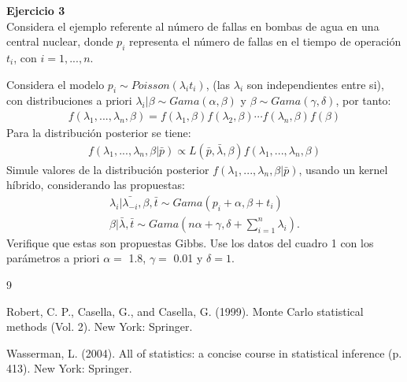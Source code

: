 \documentclass[a4paper, 11pt]{article}
\newenvironment{problem}[2][Ejercicio]
{ \begin{mdframed}[backgroundcolor= red!50] \textbf{#1 #2} \\}
	{  \end{mdframed}}
\begin{document}
\newpage


\begin{problem}{3} 
  Considera el ejemplo referente al número de fallas en bombas de agua en una central nuclear, donde $p_i$ representa el número de fallas en el tiempo de operación $t_i$, con $i = 1,...,n$.

  Considera el modelo $p_i \sim Poisson(\lambda_i t_i)$, (las $\lambda_i$ son independientes entre si), con distribuciones a priori $\lambda_i |\beta \sim Gama(\alpha,\beta)$ y $ \beta \sim Gama(\gamma,\delta)$, por tanto:
  \begin{align*}
    f(\lambda_1,...,\lambda_n,\beta) = f(\lambda_1,\beta)f(\lambda_2,\beta)\cdots f(\lambda_n,\beta)f(\beta)
  \end{align*}
  Para la distribución posterior se tiene: 
  \begin{align*}
    f(\lambda_1,...,\lambda_n,\beta|\bar{p}) \propto L(\bar{p}, \bar{\lambda},\beta)f(\lambda_1,...,\lambda_n,\beta)
  \end{align*}
  Simule valores de la distribución posterior $f(\lambda_1,...,\lambda_n,\beta|\bar{p})$, usando un kernel híbrido, considerando las propuestas:
  \begin{align*}
    \lambda_i|\bar{\lambda_{-i}},\beta,\bar{t} \sim Gama(p_i + \alpha, \beta +t_i)\\
    \beta| \bar{\lambda}, \bar{t} \sim Gama \left(n\alpha + \gamma , \delta + \sum_{i=1}^{n}\lambda_i\right) .
  \end{align*}
  Verifique que estas son propuestas Gibbs.
  Use los datos del cuadro 1 con los parámetros a priori $\alpha = $ 1.8, $\gamma = $ 0.01 y $\delta = 1$.
\end{problem}


\begin{thebibliography}{9}

    Robert, C. P., Casella, G., and Casella, G. (1999). Monte Carlo statistical methods (Vol. 2). New York: Springer.

    Wasserman, L. (2004). All of statistics: a concise course in statistical inference (p. 413). New York: Springer.
    
\end{thebibliography}
      




    
\end{document}
